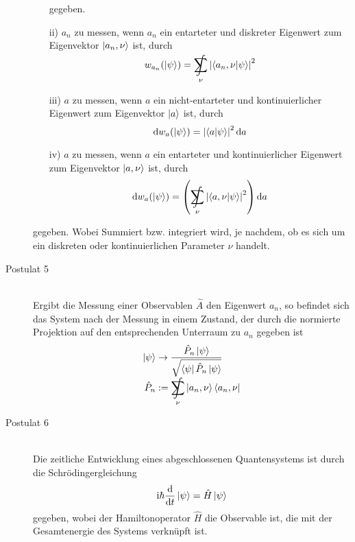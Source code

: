 \begin{description}
\begin{itemize}
					gegeben.
					\item[ii)] $a_n$ zu messen, wenn $a_n$ ein entarteter und diskreter Eigenwert zum Eigenvektor $\Ket{a_n,\nu}$ ist, durch
					\begin{equation}
						w_{a_n}(\Ket{\psi}) = \SumInt_\nu \left|\braket{a_n ,\nu|\psi}\right|^2
					\end{equation}
					\item[iii)] $a$ zu messen, wenn $a$ ein nicht-entarteter und kontinuierlicher Eigenwert zum Eigenvektor $\Ket{a}$ ist, durch
					\begin{equation}
						\mathrm{d} w_a(\Ket{\psi}) = \left| \braket{a|\psi} \right|^2 \mathrm{d} a
					\end{equation}
					\item[iv)] $a$ zu messen, wenn $a$ ein entarteter und kontinuierlicher Eigenwert zum Eigenvektor $\Ket{a, \nu}$ ist, durch
					\begin{equation}
						\diff w_a(\Ket{\psi}) = \left( \SumInt_\nu \left| \braket{a,\nu |\psi} \right|^2 \right) \diff a
					\end{equation}
				\end{itemize}
				gegeben. Wobei Summiert bzw. integriert wird, je nachdem, ob es sich um ein diskreten oder kontinuierlichen Parameter $\nu$ handelt.
			\item[Postulat 5]\hfill \\
				Ergibt die Messung einer Observablen $\hat{A}$ den Eigenwert $a_n$, so befindet sich das System nach der Messung in einem Zustand, der durch die normierte Projektion auf den entsprechenden Unterraum zu $a_n$ gegeben ist
				\begin{equation}
					\begin{aligned}
						\Ket{\psi} &\rightarrow \frac{\hat{P}_n\Ket{\psi}} {\sqrt{\Bra{\psi}\hat{P}_n\Ket{\psi}}} \\
						\hat{P}_n &:= \SumInt_\nu \Ket{a_n,\nu}\Bra{a_n,\nu} \\
					\end{aligned}
				\end{equation}
			\item[Postulat 6]\hfill \\
				Die zeitliche Entwicklung eines abgeschlossenen Quantensystems ist durch die Schrödingergleichung
				\begin{equation}
					\mathrm{i}\hbar\frac{\mathrm{d} }{\mathrm{d} t}\Ket{\psi} = \hat{H}\Ket{\psi}
				\end{equation}
				gegeben, wobei der Hamiltonoperator $\hat{H}$ die Observable ist, die mit der Gesamtenergie des Systems verknüpft ist.

\end{description}
